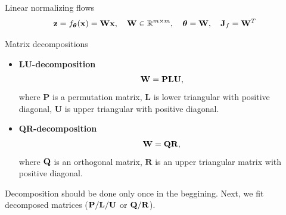 \begin{frame}{Linear normalizing flows}
	\vspace{-0.5cm}
	\[
		\mathbf{z} = f_{\boldsymbol{\theta}}(\mathbf{x}) = \mathbf{W} \mathbf{x}, \quad \mathbf{W} \in \mathbb{R}^{m \times m}, \quad \boldsymbol{\theta} = \mathbf{W}, \quad \mathbf{J}_f = \mathbf{W}^T
	\]
	\vspace{-0.7cm}
	\begin{block}{Matrix decompositions}
		\begin{itemize}
			\item \textbf{LU-decomposition}
			\[
				\mathbf{W} = \mathbf{P} \mathbf{L} \mathbf{U},
			\]
			where $\mathbf{P}$ is a permutation matrix, $\mathbf{L}$ is lower triangular with positive diagonal, $\mathbf{U}$ is upper triangular with positive diagonal.
			\item \textbf{QR-decomposition}
			\[
				\mathbf{W} = \mathbf{Q} \mathbf{R},
			\]
			where $\mathbf{Q}$ is an orthogonal matrix, $\mathbf{R}$ is an upper triangular matrix with positive diagonal.
		\end{itemize}
	\end{block}

	Decomposition should be done only once in the beggining. Next, we fit decomposed matrices ($\mathbf{P}/\mathbf{L}/\mathbf{U}$ or $\mathbf{Q}/\mathbf{R}$).

\end{frame}
